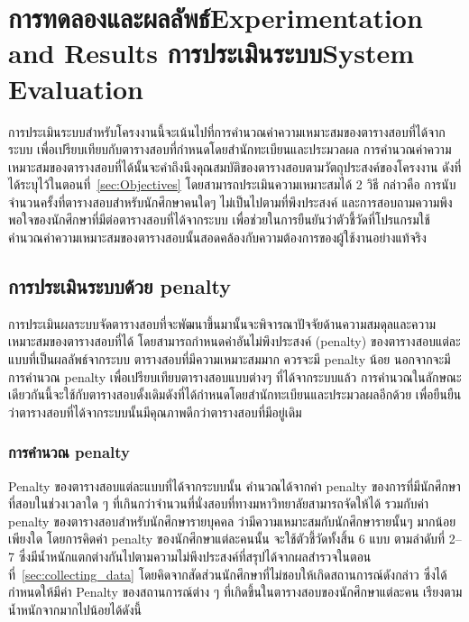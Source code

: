 \chapter{\ifproject%
\ifcpe การทดลองและผลลัพธ์\else Experimentation and Results\fi
\else%
\ifcpe การประเมินระบบ\else System Evaluation\fi
\fi}

การประเมินระบบสำหรับโครงงานนี้จะเน้นไปที่การคำนวณค่าความเหมาะสมของตารางสอบที่ได้จากระบบ เพื่อเปรียบเทียบกับตารางสอบที่กำหนดโดยสำนักทะเบียนและประมวลผล 
\enskip การคำนวณค่าความเหมาะสมของตารางสอบที่ได้นั้นจะคำถึงนึงคุณสมบัติของตารางสอบตามวัตถุประสงค์ของโครงงาน ดังที่ได้ระบุไว้ในตอนที่~\ref{sec:Objectives} 
โดยสามารถประเมินความเหมาะสมได้ 2 วิธี กล่าวคือ การนับจำนวนครั้งที่ตารางสอบสำหรับนักศึกษาคนใดๆ ไม่เป็นไปตามที่พึงประสงค์ และการสอบถามความพึงพอใจของนักศึกษาที่มีต่อตารางสอบที่ได้จากระบบ เพื่อช่วยในการยืนยันว่าตัวชี้วัดที่โปรแกรมใช้คำนวณค่าความเหมาะสมของตารางสอบนั้นสอดคล้องกับความต้องการของผู้ใช้งานอย่างแท้จริง

\section{การประเมินระบบด้วย penalty}
การประเมินผลระบบจัดตารางสอบที่จะพัฒนาขึ้นมานั้นจะพิจารณาปัจจัยด้านความสมดุลและความเหมาะสมของตารางสอบที่ได้ โดยสามารถกำหนดค่าอันไม่พึงประสงค์ (penalty) ของตารางสอบแต่ละแบบที่เป็นผลลัพธ์จากระบบ
\enskip ตารางสอบที่มีความเหมาะสมมาก ควรจะมี penalty น้อย
\enskip นอกจากจะมีการคำนวณ penalty เพื่อเปรียบเทียบตารางสอบแบบต่างๆ ที่ได้จากระบบแล้ว การคำนวณในลักษณะเดียวกันนี้จะใช้กับตารางสอบดั้งเดิมดังที่ได้กำหนดโดยสำนักทะเบียนและประมวลผลอีกด้วย เพื่อยืนยืนว่าตารางสอบที่ได้จากระบบนั้นมีคุณภาพดีกว่าตารางสอบที่มีอยู่เดิม

\subsection{การคำนวณ penalty}
Penalty ของตารางสอบแต่ละแบบที่ได้จากระบบนั้น คำนวณได้จากค่า penalty ของการที่มีนักศึกษาที่สอบในช่วงเวลาใด ๆ ที่เกินกว่าจํานวนที่นั่งสอบที่ทางมหาวิทยาลัยสามารถจัดให้ได้
รวมกับค่า penalty ของตารางสอบสำหรับนักศึกษารายบุคคล ว่ามีความเหมาะสมกับนักศึกษารายนั้นๆ มากน้อยเพียงใด 
โดยการคิดค่า penalty ของนักศึกษาแต่ละคนนั้น จะใช้ตัวชี้วัดทั้งสิ้น 6 แบบ ตามลำดับที่ 2--7 ซึ่งมีน้ำหนักแตกต่างกันไปตามความไม่พึงประสงค์ที่สรุปได้จากผลสำรวจในตอนที่~\ref{sec:collecting_data} 
โดยคิดจากสัดส่วนนักศึกษาที่ไม่ชอบให้เกิดสถานการณ์ดังกล่าว ซึ่งได้กำหนดให้มีค่า Penalty ของสถานการณ์ต่าง ๆ ที่เกิดขึ้นในตารางสอบของนักศึกษาแต่ละคน เรียงตามน้ำหนักจากมากไปน้อยได้ดังนี้
  
